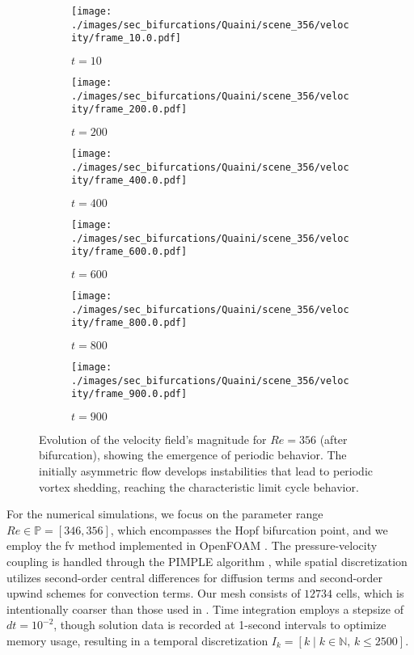 \documentclass[reqno]{amsart}[standalone]
\theoremstyle{definition}
\theoremstyle{remark}
\begin{document}
\begin{figure}[ht]
\centering

\begin{subfigure}{0.5\linewidth}
\centering
\texttt{[image: ./images/sec\_bifurcations/Quaini/scene\_356/velocity/frame\_10.0.pdf]}
\caption{$t=10$}
\end{subfigure}%
\hfill
\begin{subfigure}{0.5\linewidth}
\centering
\texttt{[image: ./images/sec\_bifurcations/Quaini/scene\_356/velocity/frame\_200.0.pdf]}
\caption{$t=200$}
\end{subfigure}

\vspace{0.2cm}

\begin{subfigure}{0.5\linewidth}
\centering
\texttt{[image: ./images/sec\_bifurcations/Quaini/scene\_356/velocity/frame\_400.0.pdf]}
\caption{$t=400$}
\end{subfigure}%
\hfill
\begin{subfigure}{0.5\linewidth}
\centering
\texttt{[image: ./images/sec\_bifurcations/Quaini/scene\_356/velocity/frame\_600.0.pdf]}
\caption{$t=600$}
\end{subfigure}

%

\begin{subfigure}{0.5\linewidth}
\centering
\texttt{[image: ./images/sec\_bifurcations/Quaini/scene\_356/velocity/frame\_800.0.pdf]}
\caption{$t=800$}
\end{subfigure}%
\hfill
\begin{subfigure}{0.5\linewidth}
\centering
\texttt{[image: ./images/sec\_bifurcations/Quaini/scene\_356/velocity/frame\_900.0.pdf]}
\caption{$t=900$}
\end{subfigure}

\caption{Evolution of the velocity field's magnitude for $Re=356$ (after bifurcation), showing the emergence of periodic behavior. The initially asymmetric flow develops instabilities that lead to periodic vortex shedding, reaching the characteristic limit cycle behavior.}
\label{figEvolutionHopf356}
\end{figure}

For the numerical simulations, we focus on the parameter range $Re\in\mathbb{P}=[346, 356]$, which encompasses the Hopf bifurcation point, and we employ the \gls{fv} method implemented in OpenFOAM \parencite{Weller_1998}. The pressure-velocity coupling is handled through the PIMPLE algorithm \parencite{Greenshields_2022}, while spatial discretization utilizes second-order central differences for diffusion terms and second-order upwind schemes for convection terms. Our mesh consists of $\num{12734}$ cells, which is intentionally coarser than those used in \parencite{QUAINI}. Time integration employs a stepsize of $dt=10^{-2}$, though solution data is recorded at 1-second intervals to optimize memory usage, resulting in a temporal discretization $I_k=[k\mid k\in\mathbb{N},\, k\leq 2500]$.
\end{document}
